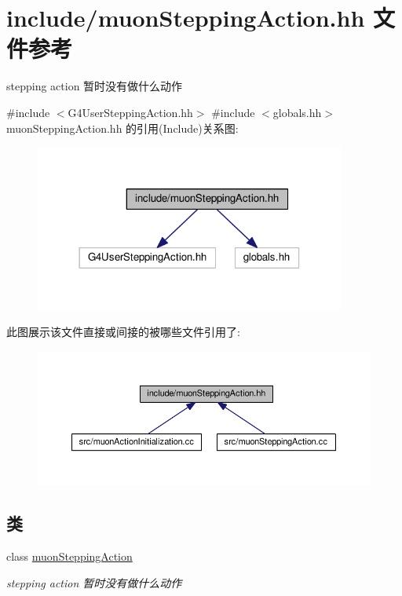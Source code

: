 \hypertarget{muonSteppingAction_8hh}{}\section{include/muon\+Stepping\+Action.hh 文件参考}
\label{muonSteppingAction_8hh}


stepping action 暂时没有做什么动作  


{\ttfamily \#include $<$G4\+User\+Stepping\+Action.\+hh$>$}\newline
{\ttfamily \#include $<$globals.\+hh$>$}\newline
muon\+Stepping\+Action.\+hh 的引用(Include)关系图\+:\nopagebreak
\begin{figure}[H]
\begin{center}
\leavevmode
\includegraphics[width=290pt]{muonSteppingAction_8hh__incl}
\end{center}
\end{figure}
此图展示该文件直接或间接的被哪些文件引用了\+:\nopagebreak
\begin{figure}[H]
\begin{center}
\leavevmode
\includegraphics[width=350pt]{muonSteppingAction_8hh__dep__incl}
\end{center}
\end{figure}
\subsection*{类}
\begin{DoxyCompactItemize}
\item 
class \hyperlink{classmuonSteppingAction}{muon\+Stepping\+Action}
\begin{DoxyCompactList}\small\item\em stepping action 暂时没有做什么动作 \end{DoxyCompactList}\end{DoxyCompactItemize}


